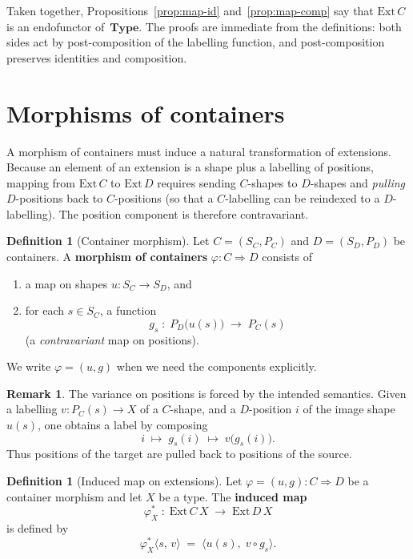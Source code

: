 \documentclass[11pt,a4paper]{article}
\theoremstyle{plain}
\theoremstyle{definition}
\newtheorem{definition}[theorem]{Definition}
\newtheorem{remark}[theorem]{Remark}
\newcommand{\Ext}{\mathrm{Ext}}
\newcommand{\Type}{\mathbf{Type}}
\begin{document}
Taken together, Propositions~\ref{prop:map-id} and~\ref{prop:map-comp} say that
$\Ext\,C$ is an endofunctor of~$\Type$. The proofs are immediate from the
definitions: both sides act by post-composition of the labelling function, and
post-composition preserves identities and composition.

\section{Morphisms of containers}

A morphism of containers must induce a natural transformation of extensions.
Because an element of an extension is a shape plus a labelling of positions,
mapping from $\Ext\,C$ to $\Ext\,D$ requires sending $C$-shapes to $D$-shapes
and \emph{pulling} $D$-positions back to $C$-positions (so that a $C$-labelling
can be reindexed to a $D$-labelling). The position component is therefore
contravariant.

\begin{definition}[Container morphism]\label{def:morphism}
Let $C = (S_C, P_C)$ and $D = (S_D, P_D)$ be containers. A \textbf{morphism of
containers} $\varphi : C \Rightarrow D$ consists of
\begin{enumerate}
  \item a map on shapes $u : S_C \to S_D$, and
  \item for each $s \in S_C$, a function
        \[
          g_s \;:\; P_D\bigl(u(s)\bigr) \;\longrightarrow\; P_C(s)
        \]
        (a \emph{contravariant} map on positions).
\end{enumerate}
We write $\varphi = (u,g)$ when we need the components explicitly.
\end{definition}

\begin{remark}
The variance on positions is forced by the intended semantics. Given a
labelling $v : P_C(s) \to X$ of a $C$-shape, and a $D$-position $i$ of the
image shape $u(s)$, one obtains a label by composing
\[
  i \;\longmapsto\; g_s(i) \;\longmapsto\; v\bigl(g_s(i)\bigr).
\]
Thus positions of the target are pulled back to positions of the source.
\end{remark}

\begin{definition}[Induced map on extensions]\label{def:tonat}
Let $\varphi = (u,g) : C \Rightarrow D$ be a container morphism and let $X$ be
a type. The \textbf{induced map}
\begin{equation}
  \varphi^*_X \;:\; \Ext\,C\,X \;\longrightarrow\; \Ext\,D\,X
\end{equation}
is defined by
\begin{equation}
  \varphi^*_X\bigl\langle s,\, v \bigr\rangle
  \;=\;
  \bigl\langle u(s),\; v \circ g_s \bigr\rangle.
\end{equation}
\end{definition}
\end{document}
